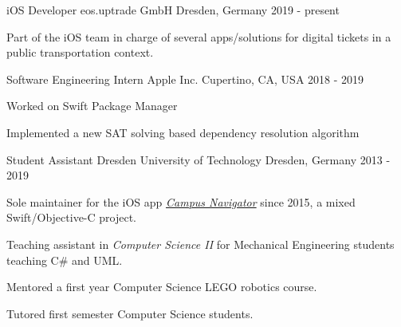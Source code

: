 

\begin{cventries}

\cventry
	{iOS Developer}
	{eos.uptrade GmbH}
	{Dresden, Germany}
	{2019 - present}
	{
		\begin{cvitems}
			\item {Part of the iOS team in charge of several apps/solutions for digital tickets in a public transportation context.}
		\end{cvitems}
	}

\cventry
	{Software Engineering Intern}
	{Apple Inc.}
	{Cupertino, CA, USA}
	{2018 - 2019}
	{
		\begin{cvitems}
			\item {Worked on Swift Package Manager}
			\item {Implemented a new SAT solving based dependency resolution algorithm}
		\end{cvitems}
	}

\cventry
	{Student Assistant}
	{Dresden University of Technology}
	{Dresden, Germany}
	{2013 - 2019}
	{
		\begin{cvitems}
			\item {Sole maintainer for the iOS app \href{https://navigator.tu-dresden.de/mobile_apps}{\emph{Campus Navigator}} since 2015, a mixed Swift/Objective-C project.}
			\item {Teaching assistant in \emph{Computer Science II} for Mechanical Engineering students teaching C\# and UML.}
			\item {Mentored a first year Computer Science LEGO robotics course.}
			\item {Tutored first semester Computer Science students.}
		\end{cvitems}
	}
	
	

\end{cventries}
